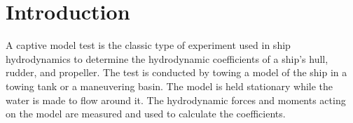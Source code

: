 \section{Introduction}
\label{sec:introduction}

A captive model test is the classic type of experiment used in ship hydrodynamics to determine the hydrodynamic coefficients of a ship’s hull, rudder, and propeller. The test is conducted by towing a model of the ship in a towing tank or a maneuvering basin. The model is held stationary while the water is made to flow around it. The hydrodynamic forces and moments acting on the model are measured and used to calculate the coefficients. 